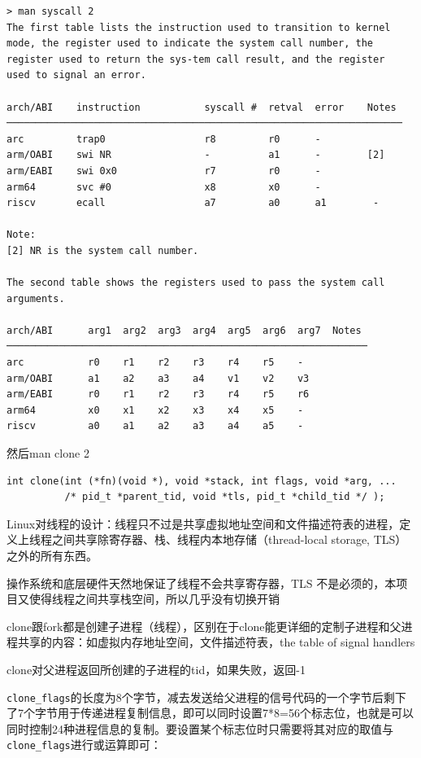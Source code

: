 \documentclass[a4paper]{exam}
\theoremstyle{definition}
\begin{document}
\begin{verbatim}
> man syscall 2
The first table lists the instruction used to transition to kernel
mode, the register used to indicate the system call number, the 
register used to return the sys‐tem call result, and the register 
used to signal an error.

arch/ABI    instruction           syscall #  retval  error    Notes
────────────────────────────────────────────────────────────────────
arc         trap0                 r8         r0      -
arm/OABI    swi NR                -          a1      -        [2]
arm/EABI    swi 0x0               r7         r0      -
arm64       svc #0                x8         x0      -
riscv       ecall                 a7         a0      a1        -

Note:
[2] NR is the system call number.

The second table shows the registers used to pass the system call
arguments.

arch/ABI      arg1  arg2  arg3  arg4  arg5  arg6  arg7  Notes
──────────────────────────────────────────────────────────────
arc           r0    r1    r2    r3    r4    r5    -
arm/OABI      a1    a2    a3    a4    v1    v2    v3
arm/EABI      r0    r1    r2    r3    r4    r5    r6
arm64         x0    x1    x2    x3    x4    x5    -
riscv         a0    a1    a2    a3    a4    a5    -
\end{verbatim}

然后man clone 2

\begin{verbatim}
int clone(int (*fn)(void *), void *stack, int flags, void *arg, ...
          /* pid_t *parent_tid, void *tls, pid_t *child_tid */ );
\end{verbatim}

Linux对线程的设计：线程只不过是共享虚拟地址空间和文件描述符表的进程，定义上线程之间共享除寄存器、栈、线程内本地存储（thread-local
storage, TLS）之外的所有东西。

操作系统和底层硬件天然地保证了线程不会共享寄存器，TLS
不是必须的，本项目又使得线程之间共享栈空间，所以几乎没有切换开销

clone跟fork都是创建子进程（线程），区别在于clone能更详细的定制子进程和父进程共享的内容：如虚拟内存地址空间，文件描述符表，the
table of signal handlers

clone对父进程返回所创建的子进程的tid，如果失败，返回-1

\texttt{clone\_flags}的长度为8个字节，减去发送给父进程的信号代码的一个字节后剩下了7个字节用于传递进程复制信息，即可以同时设置7*8=56个标志位，也就是可以同时控制24种进程信息的复制。要设置某个标志位时只需要将其对应的取值与\texttt{clone\_flags}进行或运算即可：
\end{document}
